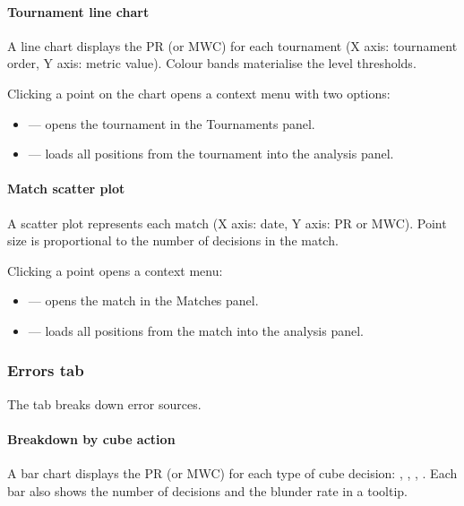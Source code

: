 \documentclass[letterpaper,10pt,english]{sphinxmanual}
\begin{document}
\paragraph{Tournament line chart}
\label{\detokenize{manuel:courbe-par-tournoi}}
\sphinxAtStartPar
A line chart displays the PR (or MWC) for each tournament (X axis: tournament order, Y axis: metric value). Colour bands materialise the level thresholds.

\sphinxAtStartPar
Clicking a point on the chart opens a context menu with two options:
\begin{itemize}
\item {} 
\sphinxAtStartPar
{} — opens the tournament in the Tournaments panel.

\item {} 
\sphinxAtStartPar
{} — loads all positions from the tournament into the analysis panel.

\end{itemize}


\paragraph{Match scatter plot}
\label{\detokenize{manuel:scatter-plot-par-match}}
\sphinxAtStartPar
A scatter plot represents each match (X axis: date, Y axis: PR or MWC). Point size is proportional to the number of decisions in the match.

\sphinxAtStartPar
Clicking a point opens a context menu:
\begin{itemize}
\item {} 
\sphinxAtStartPar
{} — opens the match in the Matches panel.

\item {} 
\sphinxAtStartPar
{} — loads all positions from the match into the analysis panel.

\end{itemize}


\subsubsection{Errors tab}
\label{\detokenize{manuel:onglet-erreurs}}
\sphinxAtStartPar
The  tab breaks down error sources.


\paragraph{Breakdown by cube action}
\label{\detokenize{manuel:repartition-par-action-de-videau}}
\sphinxAtStartPar
A bar chart displays the PR (or MWC) for each type of cube decision: , , , . Each bar also shows the number of decisions and the blunder rate in a tooltip.
\end{document}
